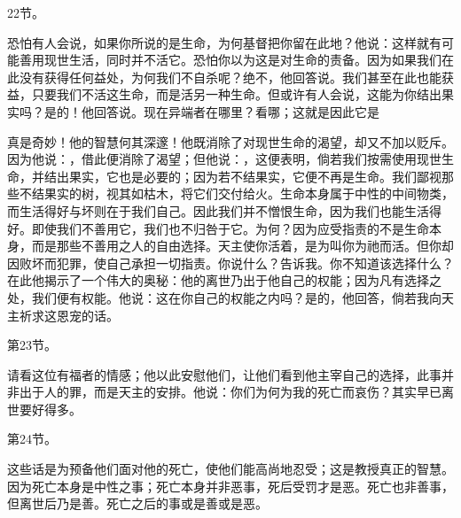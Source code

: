 22节。\par

恐怕有人会说，如果你所说的是生命，为何基督把你留在此地？他说：这样就有可能善用现世生活，同时并不活它。恐怕你以为这是对生命的责备。因为如果我们在此没有获得任何益处，为何我们不自杀呢？绝不，他回答说。我们甚至在此也能获益，只要我们不活这生命，而是活另一种生命。但或许有人会说，这能为你结出果实吗？是的！他回答说。现在异端者在哪里？看哪；这就是因此它是\par

真是奇妙！他的智慧何其深邃！他既消除了对现世生命的渴望，却又不加以贬斥。因为他说：，借此便消除了渴望；但他说：，这便表明，倘若我们按需使用现世生命，并结出果实，它也是必要的；因为若不结果实，它便不再是生命。我们鄙视那些不结果实的树，视其如枯木，将它们交付给火。生命本身属于中性的中间物类，而生活得好与坏则在于我们自己。因此我们并不憎恨生命，因为我们也能生活得好。即使我们不善用它，我们也不归咎于它。为何？因为应受指责的不是生命本身，而是那些不善用之人的自由选择。天主使你活着，是为叫你为祂而活。但你却因败坏而犯罪，使自己承担一切指责。你说什么？告诉我。你不知道该选择什么？在此他揭示了一个伟大的奥秘：他的离世乃出于他自己的权能；因为凡有选择之处，我们便有权能。他说：这在你自己的权能之内吗？是的，他回答，倘若我向天主祈求这恩宠的话。\par

第23节。 \par

请看这位有福者的情感；他以此安慰他们，让他们看到他主宰自己的选择，此事并非出于人的罪，而是天主的安排。他说：你们为何为我的死亡而哀伤？其实早已离世要好得多。\par

第24节。 \par

这些话是为预备他们面对他的死亡，使他们能高尚地忍受；这是教授真正的智慧。因为死亡本身是中性之事；死亡本身并非恶事，死后受罚才是恶。死亡也非善事，但离世后乃是善。死亡之后的事或是善或是恶。\par

